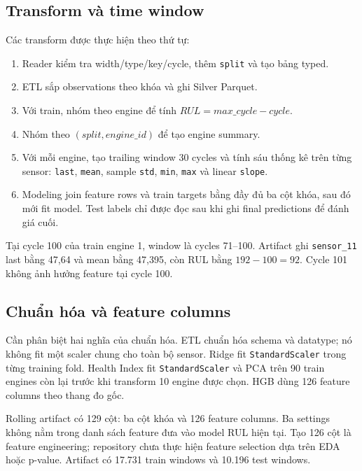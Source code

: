 \subsection{Transform và time window}

Các transform được thực hiện theo thứ tự:
\begin{enumerate}
  \item Reader kiểm tra width/type/key/cycle, thêm \texttt{split} và tạo bảng typed.
  \item ETL sắp observations theo khóa và ghi Silver Parquet.
  \item Với train, nhóm theo engine để tính $RUL=max\_cycle-cycle$.
  \item Nhóm theo $(split, engine\_id)$ để tạo engine summary.
  \item Với mỗi engine, tạo trailing window 30 cycles và tính sáu thống kê trên
        từng sensor: \texttt{last}, \texttt{mean}, sample \texttt{std},
        \texttt{min}, \texttt{max} và linear \texttt{slope}.
  \item Modeling join feature rows và train targets bằng đầy đủ ba cột khóa,
        sau đó mới fit model. Test labels chỉ được đọc sau khi ghi final
        predictions để đánh giá cuối.
\end{enumerate}

Tại cycle 100 của train engine 1, window là cycles 71--100. Artifact ghi
\texttt{sensor\_11} last bằng 47,64 và mean bằng 47,395, còn
RUL bằng $192-100=92$. Cycle 101 không ảnh hưởng feature tại cycle 100.

\subsection{Chuẩn hóa và feature columns}

Cần phân biệt hai nghĩa của chuẩn hóa. ETL chuẩn hóa schema và datatype; nó không
fit một scaler chung cho toàn bộ sensor. Ridge fit \texttt{StandardScaler} trong
từng training fold. Health Index fit \texttt{StandardScaler} và PCA trên 90
train engines còn lại trước khi transform 10 engine được chọn. HGB dùng 126
feature columns theo thang đo gốc.

Rolling artifact có 129 cột: ba cột khóa và 126 feature columns. Ba settings
không nằm trong danh sách feature đưa vào model RUL hiện tại. Tạo 126 cột là
feature engineering; repository chưa thực hiện feature selection dựa trên EDA
hoặc p-value. Artifact có 17.731 train windows và 10.196 test windows.

